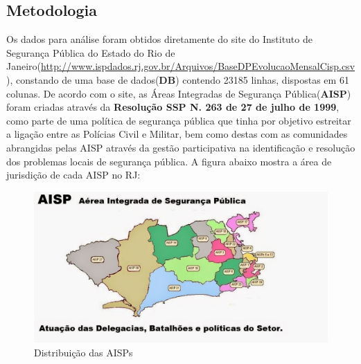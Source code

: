 \documentclass[a4paper, 12pt]{article}\usepackage[]{graphicx}\usepackage[]{color}
\begin{document}
\begin{multicols}{2}
		\section{Metodologia}
		 Os dados para análise foram obtidos diretamente do site do Instituto de Segurança Pública do Estado do Rio de Janeiro(\url{http://www.ispdados.rj.gov.br/Arquivos/BaseDPEvolucaoMensalCisp.csv})\cite{dados}, constando de uma base de dados(\textbf{DB}) contendo 23185 linhas, dispostas em 61 colunas.  De acordo com o site, as Áreas Integradas de Segurança Pública(\textbf{AISP}) foram criadas através da \textbf{Resolução SSP N. 263 de 27 de julho de 1999}, como parte de uma política de segurança pública que tinha por objetivo estreitar a ligação entre as Polícias Civil e Militar, bem como destas com as comunidades abrangidas pelas AISP através da gestão participativa na identificação e resolução dos problemas locais de segurança pública\cite{aisp}.  A figura abaixo mostra a área de jurisdição de cada AISP no RJ:
	\end{multicols}
	\begin{figure}[H]
		\centering
		\includegraphics[width=0.8\linewidth]{aisp}
		\caption{Distribuição das AISPs}
		\label{fig:aisps}
	\end{figure}
\end{document}
